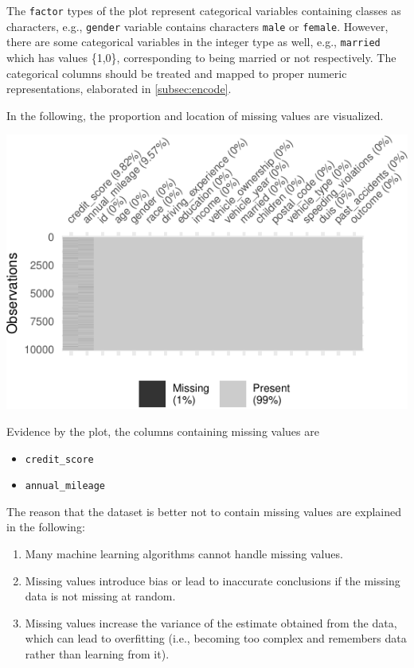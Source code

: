 \documentclass{article}
\providecommand{\tightlist}{%
  \setlength{\itemsep}{0pt}\setlength{\parskip}{0pt}}
\begin{document}
The \texttt{factor} types of the plot represent categorical variables
containing classes as characters, e.g., \texttt{gender} variable
contains characters \texttt{male} or \texttt{female}. However, there are
some categorical variables in the integer type as well, e.g.,
\texttt{married} which has values \{1,0\}, corresponding to being
married or not respectively. The categorical columns should be treated
and mapped to proper numeric representations, elaborated in
\ref{subsec:encode}.

In the following, the proportion and location of missing values are
visualized.

\begin{center}\includegraphics{report_files/figure-latex/unnamed-chunk-4-1} \end{center}

Evidence by the plot, the columns containing missing values are

\begin{itemize}
\tightlist
\item
  \texttt{credit\_score}
\item
  \texttt{annual\_mileage}
\end{itemize}

The reason that the dataset is better not to contain missing values are
explained in the following:

\begin{enumerate}
\def\labelenumi{\arabic{enumi}.}
\tightlist
\item
  Many machine learning algorithms cannot handle missing values.
\item
  Missing values introduce bias or lead to inaccurate conclusions if the
  missing data is not missing at random.
\item
  Missing values increase the variance of the estimate obtained from the
  data, which can lead to overfitting (i.e., becoming too complex and
  remembers data rather than learning from it).
\end{enumerate}
\end{document}
